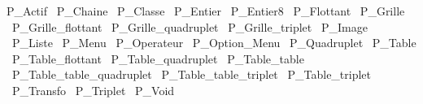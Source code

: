 P\_Actif					\
P\_Chaine				\
P\_Classe				\
P\_Entier				\
P\_Entier8				\
P\_Flottant				\
P\_Grille				\
P\_Grille\_flottant			\
P\_Grille\_quadruplet			\
P\_Grille\_triplet			\
P\_Image							\
P\_Liste					\
P\_Menu					\
P\_Operateur				\
P\_Option\_Menu					\
P\_Quadruplet				\
P\_Table					\
P\_Table\_flottant			\
P\_Table\_quadruplet			\
P\_Table\_table				\
P\_Table\_table\_quadruplet			\
P\_Table\_table\_triplet			\
P\_Table\_triplet			\
P\_Transfo				\
P\_Triplet				\
P\_Void					\
